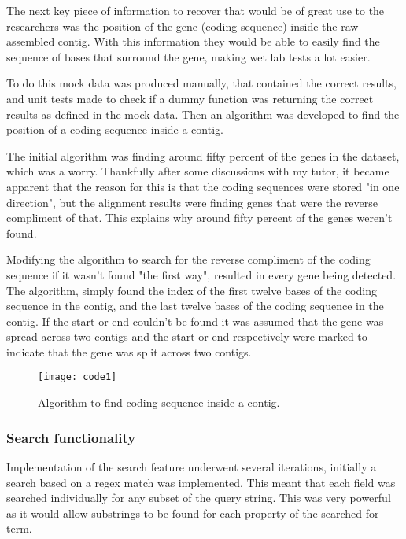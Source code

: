 {The next key piece of information to recover that would be of great use to the researchers was the position of the gene (coding sequence) inside the raw assembled contig. With this information they would be able to easily find the sequence of bases that surround the gene, making wet lab tests a lot easier. 

To do this mock data was produced manually, that contained the correct results, and unit tests made to check if a dummy function was returning the correct results as defined in the mock data. Then an algorithm was developed to find the position of a coding sequence inside a contig. 

The initial algorithm was finding around fifty percent of the genes in the dataset, which was a worry. Thankfully after some discussions with my tutor, it became apparent that the reason for this is that the coding sequences were stored "in one direction", but the alignment results were finding genes that were the reverse compliment of that. This explains why around fifty percent of the genes weren't found. 

Modifying the algorithm to search for the reverse compliment of the coding sequence if it wasn't found "the first way", resulted in every gene being detected. The algorithm, simply found the index of the first twelve bases of the coding sequence in the contig, and the last twelve bases of the coding sequence in the contig. If the start or end couldn't be found it was assumed that the gene was spread across two contigs and the start or end respectively were marked to indicate that the gene was split across two contigs. 

\begin{figure}[H]
\begin{center}
\texttt{[image: code1]}
\caption{Algorithm to find coding sequence inside a contig. \label{overflow}}
\end{center}
\end{figure}

\subsubsection{Search functionality}
Implementation of the search feature underwent several iterations, initially a search based on a regex match was implemented. This meant that each field was searched individually for any subset of the query string. This was very powerful as it would allow substrings to be found for each property of the searched for term. 

}

